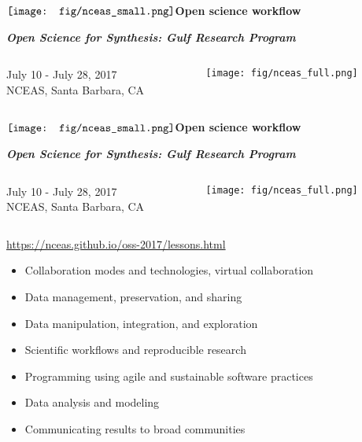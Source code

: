 \documentclass[serif]{beamer}\usepackage[]{graphicx}\usepackage[]{color}
\newcommand{\emtxt}[1]{\textbf{\textit{{\color{mypal4} #1}}}}
\begin{document}
\begin{frame}[t]{{$\vcenter{\hbox{\texttt{[image: fig/nceas\_small.png]}}}$\hspace{0.07in}\textbf{Open science workflow}}}

{\large \emtxt{Open Science for Synthesis: Gulf Research Program}}
\begin{columns}
\begin{column}{0.5\textwidth}
July 10 - July 28, 2017\\
NCEAS, Santa Barbara, CA 
\end{column}
\begin{column}{0.5\textwidth}
\hfill \texttt{[image: fig/nceas\_full.png]}
\end{column}
\end{columns}
\vspace{0.1in}
\begin{columns}
\begin{column}{0.5\textwidth}
\centerline{}
\end{column}
\begin{column}{0.5\textwidth}
\centerline{}
\end{column}
\end{columns}
\end{frame}

\begin{frame}[t]{{$\vcenter{\hbox{\texttt{[image: fig/nceas\_small.png]}}}$\hspace{0.07in}\textbf{Open science workflow}}}

{\large \emtxt{Open Science for Synthesis: Gulf Research Program}}
\begin{columns}
\begin{column}{0.5\textwidth}
July 10 - July 28, 2017\\
NCEAS, Santa Barbara, CA 
\end{column}
\begin{column}{0.5\textwidth}
\hfill \texttt{[image: fig/nceas\_full.png]}
\end{column}
\end{columns}
\vspace{0.1in}
\vfill
\centerline{\url{https://nceas.github.io/oss-2017/lessons.html}}
\begin{itemize}
\item Collaboration modes and technologies, virtual collaboration
\item Data management, preservation, and sharing
\item Data manipulation, integration, and exploration
\item Scientific workflows and reproducible research
\item Programming using agile and sustainable software practices
\item Data analysis and modeling
\item Communicating results to broad communities
\end{itemize}
\vfill
\end{frame}
\end{document}
